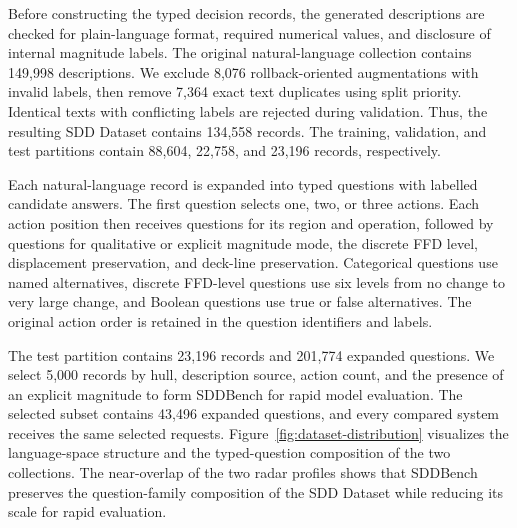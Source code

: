 \documentclass[a4paper,fleqn]{cas-dc}
\begin{document}
Before constructing the typed decision records, the generated descriptions are
checked for plain-language format, required numerical values, and disclosure of
internal magnitude labels. The original natural-language collection contains
149,998 descriptions. We exclude 8,076 rollback-oriented augmentations with
invalid labels, then remove 7,364 exact text duplicates using split priority. Identical texts with conflicting labels are
rejected during validation. Thus, the resulting SDD Dataset contains 134,558
records. The training, validation, and test partitions contain 88,604, 22,758,
and 23,196 records, respectively.

Each natural-language record is expanded into typed questions with labelled
candidate answers. The first question selects one, two, or three actions. Each
action position then receives questions for its region and operation, followed by
questions for qualitative or explicit magnitude mode, the discrete FFD level,
displacement preservation, and deck-line preservation. Categorical questions use
named alternatives, discrete FFD-level questions use six levels from no change to
very large change, and Boolean questions use true or false alternatives. The
original action order is retained in the question identifiers and labels.

The test partition contains 23,196 records and 201,774 expanded questions. We
select 5,000 records by hull, description source, action count, and the presence
of an explicit magnitude to form SDDBench for rapid model evaluation. The
selected subset contains 43,496 expanded questions, and every compared system
receives the same selected requests. Figure~\ref{fig:dataset-distribution}
visualizes the language-space structure and the typed-question composition of the
two collections. The near-overlap of the two radar profiles shows that SDDBench
preserves the question-family composition of the SDD Dataset while reducing its
scale for rapid evaluation.
\end{document}

